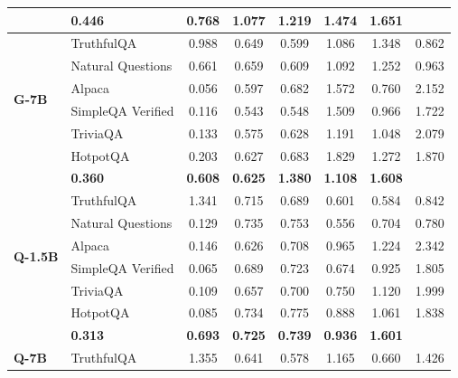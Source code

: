 \begin{table}[ht]
\begin{tabular}{ll cccccc}
        \rowcolor[gray]{.95} \multicolumn{2}{r}{\textbf{Total SGS}} & \textbf{0.446} & \textbf{0.768} & \textbf{1.077} & \textbf{1.219} & \textbf{1.474} & \textbf{1.651} \\
        \midrule
        \multirow{6}{*}{\textbf{G-7B}}
        & TruthfulQA \cite{lin2022truthfulqa} & 0.988 & 0.649 & 0.599 & 1.086 & 1.348 & 0.862 \\
        & Natural Questions \cite{kwiatkowski2019natural} & 0.661 & 0.659 & 0.609 & 1.092 & 1.252 & 0.963 \\
        & Alpaca \cite{taori2023stanford-alpaca} & 0.056 & 0.597 & 0.682 & 1.572 & 0.760 & 2.152 \\
        & SimpleQA Verified \cite{haas_simpleqa_2026} & 0.116 & 0.543 & 0.548 & 1.509 & 0.966 & 1.722 \\
        & TriviaQA \cite{joshi2017triviaqa} & 0.133 & 0.575 & 0.628 & 1.191 & 1.048 & 2.079 \\
        & HotpotQA \cite{yang2018hotpotqa} & 0.203 & 0.627 & 0.683 & 1.829 & 1.272 & 1.870 \\
        \rowcolor[gray]{.95} \multicolumn{2}{r}{\textbf{Total SGS}} & \textbf{0.360} & \textbf{0.608} & \textbf{0.625} & \textbf{1.380} & \textbf{1.108} & \textbf{1.608} \\
        \midrule
        \multirow{6}{*}{\textbf{Q-1.5B}}
        & TruthfulQA \cite{lin2022truthfulqa} & 1.341 & 0.715 & 0.689 & 0.601 & 0.584 & 0.842 \\
        & Natural Questions \cite{kwiatkowski2019natural} & 0.129 & 0.735 & 0.753 & 0.556 & 0.704 & 0.780 \\
        & Alpaca \cite{taori2023stanford-alpaca} & 0.146 & 0.626 & 0.708 & 0.965 & 1.224 & 2.342 \\
        & SimpleQA Verified \cite{haas_simpleqa_2026} & 0.065 & 0.689 & 0.723 & 0.674 & 0.925 & 1.805 \\
        & TriviaQA \cite{joshi2017triviaqa} & 0.109 & 0.657 & 0.700 & 0.750 & 1.120 & 1.999 \\
        & HotpotQA \cite{yang2018hotpotqa} & 0.085 & 0.734 & 0.775 & 0.888 & 1.061 & 1.838 \\
        \rowcolor[gray]{.95} \multicolumn{2}{r}{\textbf{Total SGS}} & \textbf{0.313} & \textbf{0.693} & \textbf{0.725} & \textbf{0.739} & \textbf{0.936} & \textbf{1.601} \\
        \midrule
        \multirow{6}{*}{\textbf{Q-7B}}
        & TruthfulQA \cite{lin2022truthfulqa} & 1.355 & 0.641 & 0.578 & 1.165 & 0.660 & 1.426 \\

\end{tabular}
\end{table}

